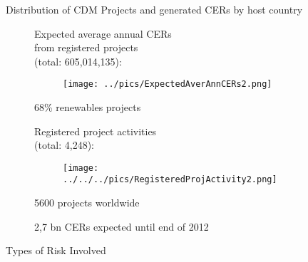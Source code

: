 {Distribution of CDM Projects and generated CERs by host country }
\begin{figure}[t]
\begin{minipage}[t]{0.475\textwidth}
Expected average annual CERs \\
from registered projects \\
(total: 605,014,135):
\vspace*{-0.7cm}
\begin{figure}
\centering
\texttt{[image: ../pics/ExpectedAverAnnCERs2.png]}
\end{figure}
\vspace*{-0.8cm}






	68\% renewables projects %




\vspace*{-0.9cm}

\end{minipage}
\begin{minipage}[t]{0.475\textwidth}
Registered project activities\\
(total: 4,248):
\vspace*{-0.7cm}
\begin{figure}
\centering
\texttt{[image: ../../../pics/RegisteredProjActivity2.png]}
\end{figure}
\vspace*{-0.8cm}






	5600  projects worldwide


	2,7 bn CERs expected until end of 2012




\end{minipage}
\end{figure}

{Types of Risk Involved}






